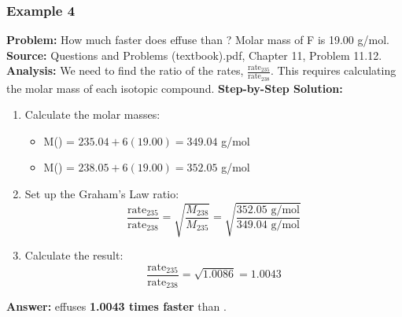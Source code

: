 \documentclass{article}
\begin{document}
\subsubsection{Example 4}
\textbf{Problem:} How much faster does  effuse than ? Molar mass of F is 19.00 g/mol.
\textbf{Source:} Questions and Problems (textbook).pdf, Chapter 11, Problem 11.12.
\textbf{Analysis:} We need to find the ratio of the rates, $\frac{\text{rate}_{235}}{\text{rate}_{238}}$. This requires calculating the molar mass of each isotopic compound.
\textbf{Step-by-Step Solution:}
\begin{enumerate}
    \item Calculate the molar masses:
    \begin{itemize}
        \item M() = $235.04 + 6(19.00) = 349.04$ g/mol
        \item M() = $238.05 + 6(19.00) = 352.05$ g/mol
    \end{itemize}
    \item Set up the Graham's Law ratio:
    \[ \frac{\text{rate}_{235}}{\text{rate}_{238}} = \sqrt{\frac{M_{238}}{M_{235}}} = \sqrt{\frac{352.05 \text{ g/mol}}{349.04 \text{ g/mol}}} \]
    \item Calculate the result:
    \[ \frac{\text{rate}_{235}}{\text{rate}_{238}} = \sqrt{1.0086} = 1.0043 \]
\end{enumerate}
\textbf{Answer:}  effuses \textbf{1.0043 times faster} than .
\end{document}
